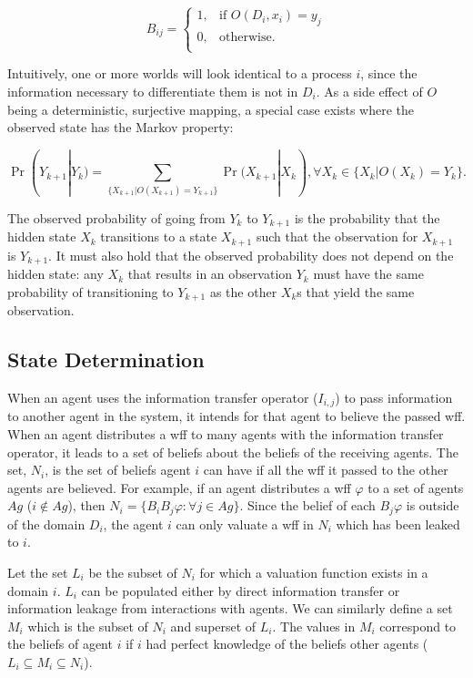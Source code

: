 \begin{equation}
 B_{ij} =
   \begin{cases}
    1, & \text{if } O(D_i, x_i) = y_j\\
    0, & \text{otherwise.} \\
  \end{cases}
\end{equation}

Intuitively, one or more worlds will look identical to a process $i$, since the information necessary to differentiate them is not in $D_i$.
As a side effect of $O$ being a deterministic, surjective mapping, a special case exists where the observed state has the Markov property:

\begin{equation}
    \Pr(Y_{k+1} | Y_{k}) = \sum_{\{X_{k+1} | O(X_{k+1}) = Y_{k+1}\}} \Pr(X_{k+1} | X_{k}), \forall X_k \in \{X_k | O(X_k) = Y_k\}.
\label{eq:hidden-to-chain}
\end{equation}

The observed probability of going from $Y_k$ to $Y_{k+1}$ is the probability that the hidden state $X_k$ transitions to a state $X_{k+1}$ such that the observation for $X_{k+1}$ is $Y_{k+1}$.
It must also hold that the observed probability does not depend on the hidden state: any $X_k$ that results in an observation $Y_k$ must have the same probability of transitioning to $Y_{k+1}$ as the other $X_{k}$s that yield the same observation.

\subsection{State Determination}

When an agent uses the information transfer operator ($I_{i,j}$) to pass information to another agent in the system, it intends for that agent to believe the passed wff.
When an agent distributes a wff to many agents with the information transfer operator, it leads to a set of beliefs about the beliefs of the receiving agents.
The set, $N_i$, is the set of beliefs agent $i$ can have if all the wff it passed to the other agents are believed.
For example, if an agent distributes a wff $\varphi$ to a set of agents $Ag$ ($i \not \in Ag$), then $N_i = \{ B_i B_j \varphi : \forall j \in Ag \}$.
Since the belief of each $B_j \varphi$ is outside of the domain $D_i$, the agent $i$ can only valuate a wff in $N_i$ which has been leaked to $i$.

Let the set $L_i$ be the subset of $N_i$ for which a valuation function exists in a domain $i$.
$L_i$ can be populated either by direct information transfer or information leakage from interactions with agents.
We can similarly define a set $M_i$ which is the subset of $N_i$ and superset of $L_i$.
The values in $M_i$ correspond to the beliefs of agent $i$ if $i$ had perfect knowledge of the beliefs other agents ($L_i \subseteq M_i \subseteq N_i$).

